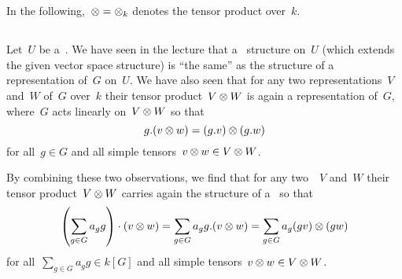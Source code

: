 \section{}

In the following,~${\otimes} = {\otimes_k}$ denotes the tensor product over~$k$.





\subsection{}

Let~$U$ be a~{\kvs}.
We have seen in the lecture that a~{} structure on~$U$ (which extends the given vector space structure) is \enquote{the same} as the structure of a representation of~$G$ on~$U$.
We have also seen that for any two representations~$V$ and~$W$ of~$G$ over~$k$ their tensor product~$V \otimes W$ is again a representation of~$G$, where~$G$ acts linearly on~$V \otimes W$ so that
\[
    g.(v \otimes w)
  = (g.v) \otimes (g.w)
\]
for all~$g \in G$ and all simple tensors~$v \otimes w \in V \otimes W$.

By combining these two observations, we find that for any two~{}~$V$ and~$W$ their tensor product~$V \otimes W$ carries again the structure of a~{} so that
\[
    \left( \sum_{g \in G} a_g g \right) \cdot (v \otimes w)
  = \sum_{g \in G} a_g g.(v \otimes w)
  = \sum_{g \in G} a_g (gv) \otimes (gw)
\]
for all~$\sum_{g \in G} a_g g \in k[G]$ and all simple tensors~$v \otimes w \in V \otimes W$.


